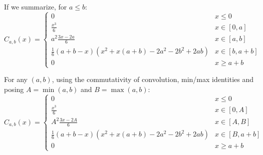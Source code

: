 \documentclass[a4paper,10pt]{article}
\begin{document}
If we summarize, for $a \le b$:
\[ C_{a,b}(x) = \begin{cases}
    0 & x \le 0 \\
    \frac{x^3}{6} & x \in [0, a] \\
    a^2 \frac{3x-2a}{6} & x \in [a, b] \\
    \frac{1}{6} (a+b-x) (x^2 + x(a+b) -2a^2-2b^2+2ab) & x \in [b, a+b] \\
    0 & x \ge a+b
\end{cases} \]

For any $(a,b)$, using the commutativity of convolution, min/max identities and posing $A=\min(a,b)$ and $B=\max(a,b)$:
\[ C_{a,b}(x) = \begin{cases}
    0 & x \le 0 \\
    \frac{x^3}{6} & x \in [0, A] \\
    A^2 \frac{3x-2A}{6} & x \in [A, B] \\
    \frac{1}{6} (a+b-x) (x^2 + x(a+b) -2a^2-2b^2+2ab) & x \in [B, a+b] \\
    0 & x \ge a+b
\end{cases} \]

\end{document}
